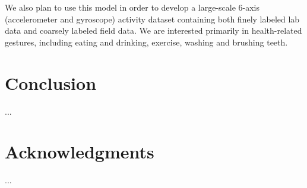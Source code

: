 \documentclass{sigchi}
\begin{document}
We also plan to use this model in order to develop a large-scale 6-axis (accelerometer and gyroscope) activity dataset containing both finely labeled lab data and coarsely labeled field data. We are interested primarily in health-related gestures, including eating and drinking, exercise, washing and brushing teeth.

\section{Conclusion}

...

\section{Acknowledgments}

...

%
%
%
%
%
\balance{}

\balance{}



\end{document}

